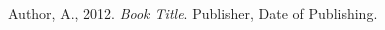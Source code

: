 \documentclass[a4paper,12pt]{article}
\title{}
\date{\today}
\author{}
\begin{document}
\maketitle

\newpage



\clearpage

\begin{thebibliography}{5}

  Author, A., 2012. 
  \textit{Book Title}.
  Publisher, Date of Publishing. 

\end{thebibliography}
\end{document}
